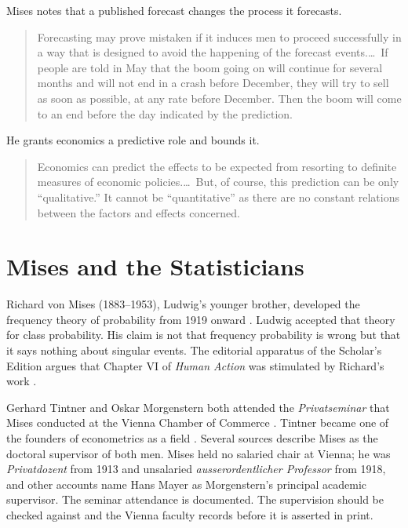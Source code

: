 \documentclass[12pt]{article}
\begin{document}
Mises notes that a published forecast changes the process it forecasts.

\begin{quote}
Forecasting may prove mistaken if it induces men to proceed successfully in a
way that is designed to avoid the happening of the forecast events.\ldots\ If
people are told in May that the boom going on will continue for several months
and will not end in a crash before December, they will try to sell as soon as
possible, at any rate before December.  Then the boom will come to an end before
the day indicated by the prediction.
\hfill \citep[p.~66]{Mises1962Ultimate}
\end{quote}

He grants economics a predictive role and bounds it.

\begin{quote}
Economics can predict the effects to be expected from resorting to definite
measures of economic policies.\ldots\ But, of course, this prediction can be
only ``qualitative.''  It cannot be ``quantitative'' as there are no constant
relations between the factors and effects concerned.
\hfill \citep[p.~67]{Mises1962Ultimate}
\end{quote}

\section{Mises and the Statisticians}
\label{sec:statisticians}

Richard von Mises (1883--1953), Ludwig's younger brother, developed the
frequency theory of probability from 1919 onward \citep{MisesR1957Probability}.
Ludwig accepted that theory for class probability.  His claim is not that
frequency probability is wrong but that it says nothing about singular events.
The editorial apparatus of the Scholar's Edition argues that Chapter VI of
\emph{Human Action} was stimulated by Richard's work
\citep{Mises1998HumanAction}.

Gerhard Tintner and Oskar Morgenstern both attended the \emph{Privatseminar}
that Mises conducted at the Vienna Chamber of Commerce
\citep{Haberler1961,Hulsmann2007}.  Tintner became one of the founders of
econometrics as a field \citep{Tintner1952}.  Several sources describe Mises as
the doctoral supervisor of both men.  Mises held no salaried chair at Vienna;
he was \emph{Privatdozent} from 1913 and unsalaried \emph{ausserordentlicher
Professor} from 1918, and other accounts name Hans Mayer as Morgenstern's
principal academic supervisor.  The seminar attendance is documented.  The
supervision should be checked against \citet{Hulsmann2007} and the Vienna
faculty records before it is asserted in print.
\end{document}
